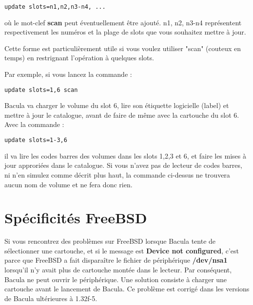 \footnotesize
\begin{verbatim}
update slots=n1,n2,n3-n4, ...
\end{verbatim}
\normalsize

o\`u le mot-clef {\bf scan} peut \'eventuellement \^etre ajout\'e. n1, n2, n3-n4
repr\'esentent respectivement les num\'eros et la plage de slots que vous souhaitez 
mettre \`a jour. 

Cette forme est particuli\`erement utile si vous voulez utiliser "scan" (couteux en temps) 
en restrignant l'op\'eration \`a quelques slots.

Par exemple, si vous lancez la commande :

\footnotesize
\begin{verbatim}
update slots=1,6 scan
\end{verbatim}
\normalsize

Bacula va charger le volume du slot 6, lire son \'etiquette logicielle (label) et 
mettre \`a jour le catalogue, avant de faire de m\^eme avec la cartouche du slot 6.
Avec la commande :

\footnotesize
\begin{verbatim}
update slots=1-3,6
\end{verbatim}
\normalsize

il va lire les codes barres des volumes dans les slots 1,2,3 et 6, et faire les 
mises \`a jour approri\'ees dans le catalogue. Si vous n'avez pas de lecteur de 
codes barres, ni n'en simulez comme d\'ecrit plus haut, la commande ci-dessus 
ne trouvera aucun nom de volume et ne fera donc rien.

\label{FreeBSD}

\section{Sp\'ecificit\'es FreeBSD}

Si vous rencontrez des probl\`emes sur FreeBSD lorsque Bacula tente de s\'electionner 
une cartouche, et si le message est {\bf Device not configured}, c'est 
parce que FreeBSD a fait dispara\^itre le fichier de p\'eriph\'erique {\bf /dev/nsa1} 
lorsqu'il n'y avait plus de cartouche mont\'ee dans le lecteur. Par cons\'equent, 
Bacula ne peut ouvrir le p\'eriph\'erique. Une solution consiste \`a charger une 
cartouche avant le lancement de Bacula. Ce probl\`eme est corrig\'e dans les 
versions de Bacula ult\'erieures \`a 1.32f-5.

